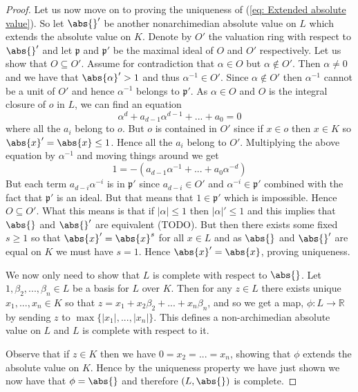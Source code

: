 \documentclass{article}
\newcommand{\mfrak}[1]{\mathfrak{#1}}
\newcommand{\mbb}[1]{\mathbb{#1}}
\begin{document}
\begin{proof}
    Let us now move on to proving the uniqueness of (\ref{eq: Extended absolute value}). So let $\abs{}'$ be another nonarchimedian absolute value on $L$ which extends the absolute value on $K$. Denote by $O'$ the valuation ring with respect to $\abs{}'$ and let $\mfrak p$ and $\mfrak p'$ be the maximal ideal of $O$ and $O'$ respectively. Let us show that $O \subseteq O'$. Assume for contradiction that $\alpha \in O$ but $\alpha \notin O'$. Then $\alpha \neq 0$ and we have that $\abs{\alpha}' > 1$ and thus $\alpha^{-1} \in O'$. Since $\alpha \notin O'$ then $\alpha^{-1}$ cannot be a unit of $O'$ and hence $\alpha^{-1}$ belongs to $\mfrak p'$. As $\alpha \in O$ and $O$ is the integral closure of $o$ in $L$, we can find an equation
    $$\alpha^d + a_{d-1}\alpha^{d-1} + ... + a_0 = 0$$
    where all the $a_i$ belong to $o$. But $o$ is contained in $O'$ since if $x \in o$ then $x \in K$ so $\abs{x}' = \abs{x} \leq 1$. Hence all the $a_i$ belong to $O'$. Multiplying the above equation by $\alpha^{-1}$ and moving things around we get $$1 = -(a_{d-1}\alpha^{-1} + ... + a_0\alpha^{-d})$$
    But each term $a_{d-i} \alpha^{-i}$ is in $\mfrak p'$ since $a_{d-i} \in O'$ and $\alpha^{-i} \in \mfrak p'$ combined with the fact that $\mfrak p'$ is an ideal. But that means that $1 \in \mfrak p'$ which is impossible. Hence $O \subseteq O'$. What this means is that if $|\alpha| \leq 1$ then $|\alpha|' \leq 1$ and this implies that $\abs{}$ and $\abs{}'$ are equivalent (TODO). But then there exists some fixed $s \geq 1$ so that $\abs{x}' = \abs{x}^s$ for all $x \in L$ and as $\abs{}$ and $\abs{}'$ are equal on $K$ we must have $s = 1$. Hence $\abs{x}' = \abs{x}$, proving uniqueness.

    We now only need to show that $L$ is complete with respect to $\abs{}$. Let $1, \beta_2, ..., \beta_{n} \in L$ be a basis for $L$ over $K$. Then for any $z \in L$ there exists unique $x_1, ..., x_n \in K$ so that $z = x_1 + x_2 \beta_2 + ... + x_{n}\beta_{n}$, and so we get a map, $\phi : L \to \mbb R$ by sending $z$ to $\max \{|x_1|, ...,|x_n|\}$. This defines a non-archimedian absolute value on $L$ and $L$ is complete with respect to it. 
    
    
    
    Observe that if $z \in K$ then we have $0 = x_2 = ... = x_n$, showing that $\phi$ extends the absolute value on $K$. Hence by the uniqueness property we have just shown we now have that $\phi = \abs{}$ and therefore $(L, \abs{})$ is complete. 
\end{proof}
\end{document}
